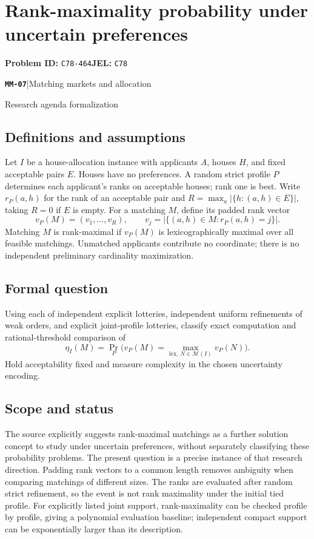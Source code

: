 \documentclass[11pt,a4paper]{article}
\newcommand{\entrymeta}[3]{{\sffamily\small\color{muted}\textbf{\texttt{#1}}\quad|\quad #2\par #3\par}}
\begin{document}
\section*{Rank-maximality probability under uncertain preferences}
\textbf{Problem ID:} \texttt{C78-464}\quad \textbf{JEL:} \texttt{C78}\par
\label{problem:OP-0548}
\label{beyond:MM-07}
\entrymeta{MM-07}{Matching markets and allocation}{Research agenda formalization}
\subsection*{Definitions and assumptions}
Let $I$ be a house-allocation instance with applicants $A$, houses $H$, and fixed acceptable pairs $E$. Houses have no preferences. A random strict profile $P$ determines each applicant's ranks on acceptable houses; rank one is best. Write $r_P(a,h)$ for the rank of an acceptable pair and $R=\max_a|\{h:(a,h)\in E\}|$, taking $R=0$ if $E$ is empty. For a matching $M$, define its padded rank vector
\[
 v_P(M)=(v_1,\ldots,v_R),\qquad
 v_j=|\{(a,h)\in M:r_P(a,h)=j\}|.
\]
Matching $M$ is rank-maximal if $v_P(M)$ is lexicographically maximal over all feasible matchings. Unmatched applicants contribute no coordinate; there is no independent preliminary cardinality maximization.
\subsection*{Formal question}
Using each of independent explicit lotteries, independent uniform refinements of weak orders, and explicit joint-profile lotteries, classify exact computation and rational-threshold comparison of
\[
 \eta_I(M)=\Pr_P\bigl(v_P(M)=\max_{\mathrm{lex},\,N\in\mathcal M(I)}v_P(N)\bigr).
\]
Hold acceptability fixed and measure complexity in the chosen uncertainty encoding.
\subsection*{Scope and status}
The source explicitly suggests rank-maximal matchings as a further solution concept to study under uncertain preferences, without separately classifying these probability problems. The present question is a precise instance of that research direction. Padding rank vectors to a common length removes ambiguity when comparing matchings of different sizes. The ranks are evaluated after random strict refinement, so the event is not rank maximality under the initial tied profile. For explicitly listed joint support, rank-maximality can be checked profile by profile, giving a polynomial evaluation baseline; independent compact support can be exponentially larger than its description.
\end{document}
